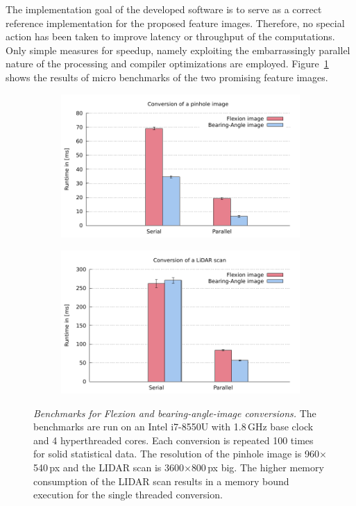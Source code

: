 The implementation goal of the developed software is to serve as a correct reference implementation for the proposed feature images.
Therefore, no special action has been taken to improve latency or throughput of the computations.
Only simple measures for speedup, namely exploiting the embarrassingly parallel nature of the processing and compiler optimizations are employed.
Figure~\ref{fig:benchmarks} shows the results of micro benchmarks of the two promising feature images.
\begin{figure}
\centering
    \begin{subfigure}[b]{0.45\linewidth}
        \includegraphics[width=\linewidth]{chapter06/results/benchmarks/pinhole_benchmarks.pdf}
    \end{subfigure}\quad
    \begin{subfigure}[b]{0.45\linewidth}
        \includegraphics[width=\linewidth]{chapter06/results/benchmarks/laserscan_benchmarks.pdf}
    \end{subfigure}
    \caption[Benchmarks for Flexion and \gls{bearing-angle-image} conversions]{\emph{Benchmarks for Flexion and \gls{bearing-angle-image} conversions.} The benchmarks are run on an Intel i7-8550U with 1.8\,GHz base clock and 4 hyperthreaded cores. Each conversion is repeated 100 times for solid statistical data. The resolution of the pinhole image is 960$\times$540\,px and the \acrshort{LIDAR} scan is 3600$\times$800\,px big. The higher memory consumption of the \acrshort{LIDAR} scan results in a memory bound execution for the single threaded conversion.}\label{fig:benchmarks}
\end{figure}

